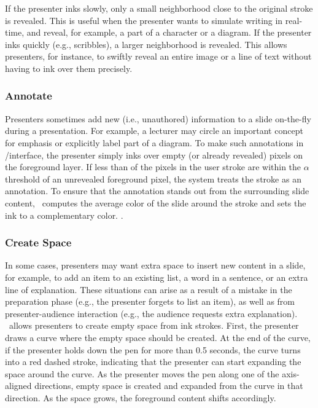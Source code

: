 If the presenter inks slowly, only a small neighborhood close to the original stroke is revealed. This is useful when the presenter wants to simulate writing in real-time, and reveal, for example, a part of a character or a diagram.
%
If the presenter inks quickly (e.g., scribbles), a larger neighborhood is revealed. This allows presenters, for instance, to swiftly reveal an entire image or a line of text without having to ink over them precisely.   
\fi

\subsubsection{Annotate}
Presenters sometimes add new (i.e., unauthored) information to a slide on-the-fly during a presentation.
%
For example, a lecturer may circle an important concept for emphasis or explicitly label part of a diagram. 
%
To make such annotations in /interface, the presenter simply inks over empty (or already revealed) pixels on the foreground layer. If less than  of the pixels in the user stroke are within the $\alpha$ threshold of an unrevealed foreground pixel, the system treats the stroke as an annotation. To ensure that the annotation stands out from the surrounding slide content, \interface\ computes the average color of the slide around the stroke and sets the ink to a complementary color. . 

\subsubsection{Create Space}
In some cases, presenters may want extra space to insert new content in a slide, for example, to add an item to an existing list, a word in a sentence, or an extra line of explanation. These situations can arise as a result of a mistake in the preparation phase (e.g., the presenter forgets to list an item), as well as from presenter-audience interaction (e.g., the audience requests extra explanation). \interface\ allows presenters to create empty space from ink strokes. First, the presenter draws a curve where the empty space should be created. At the end of the curve, if the presenter holds down the pen for more than 0.5 seconds, the curve turns into a red dashed stroke, indicating that the presenter can start expanding the space around the curve. As the presenter moves the pen along one of the axis-aligned directions, empty space is created and expanded from the curve in that direction.  As the space grows, the foreground content shifts accordingly. 
